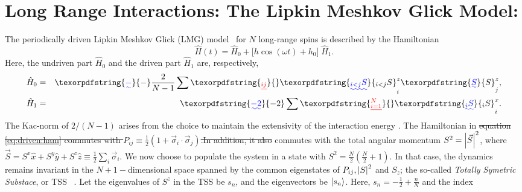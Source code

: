 \documentclass[%
reprint,
superscriptaddress,
amsmath,amssymb,
aps,
prb,
showkeys,
]{revtex4-2}
\providecommand{\DIFaddtex}[1]{{\protect\color{blue}\uwave{#1}}} %
\providecommand{\DIFdeltex}[1]{{\protect\color{red}\sout{#1}}}                      %
\providecommand{\DIFaddbegin}{} %
\providecommand{\DIFaddend}{} %
\providecommand{\DIFdelbegin}{} %
\providecommand{\DIFdelend}{} %
\providecommand{\DIFadd}[1]{\texorpdfstring{\DIFaddtex{#1}}{#1}} %
\providecommand{\DIFdel}[1]{\texorpdfstring{\DIFdeltex{#1}}{}} %
\newcommand{\DIFscaledelfig}{0.5}
\newlength{\DIFdelgraphicswidth} %
\newlength{\DIFdelgraphicsheight} %
\newcommand{\DIFaddincludegraphics}[2][]{{\color{blue}\fbox{\DIFOincludegraphics[#1]{#2}}}} %
\newcommand{\DIFdelincludegraphics}[2][]{%
\sbox{\DIFdelgraphicsbox}{\DIFOincludegraphics[#1]{#2}}%
\settoboxwidth{\DIFdelgraphicswidth}{\DIFdelgraphicsbox} %
\settoboxtotalheight{\DIFdelgraphicsheight}{\DIFdelgraphicsbox} %
\scalebox{\DIFscaledelfig}{%
\parbox[b]{\DIFdelgraphicswidth}{\usebox{\DIFdelgraphicsbox}\\[-\baselineskip] \rule{\DIFdelgraphicswidth}{0em}}\llap{\resizebox{\DIFdelgraphicswidth}{\DIFdelgraphicsheight}{%
\setlength{\unitlength}{\DIFdelgraphicswidth}%
\begin{picture}(1,1)%
\thicklines\linethickness{2pt} %
{\color[rgb]{1,0,0}\put(0,0){\framebox(1,1){}}}%
{\color[rgb]{1,0,0}\put(0,0){\line( 1,1){1}}}%
{\color[rgb]{1,0,0}\put(0,1){\line(1,-1){1}}}%
\end{picture}%
}\hspace*{3pt}}} %
} %
\DeclareRobustCommand{\DIFaddbegin}{\DIFOaddbegin \let\includegraphics\DIFaddincludegraphics} %
\DeclareRobustCommand{\DIFaddend}{\DIFOaddend \let\includegraphics\DIFOincludegraphics} %
\DeclareRobustCommand{\DIFdelbegin}{\DIFOdelbegin \let\includegraphics\DIFdelincludegraphics} %
\DeclareRobustCommand{\DIFdelend}{\DIFOaddend \let\includegraphics\DIFOincludegraphics} %
\begin{document}
\section{\label{sec:level3}Long Range Interactions: The Lipkin Meshkov Glick Model: }	
The periodically driven {Lipkin Meshkov Glick (LMG)} model~\cite{lmg1965_1,defenu2018} for $N$ long-range spins is described by the Hamiltonian
\begin{equation}
	\hat{H}(t) = \hat{H}_0 + \big[h \cos{(\omega t)} + h_0\big]\; \hat{H}_1.
	\label{eq:driven:ham}
\end{equation}
Here, the undriven part $\hat{H}_0$ and the driven part $\hat{H}_1$ are, respectively, 
	\begin{eqnarray}
		\hat{H}_0 &=& \DIFaddbegin \DIFadd{-}\DIFaddend \frac{2}{N-1} \sum\DIFdelbegin \DIFdel{_{ij}}%
\DIFdelend \DIFaddbegin \DIFadd{_{i<j}S}\DIFaddend ^z_i \DIFdelbegin %
\DIFdelend \DIFaddbegin \DIFadd{S}\DIFaddend ^z_j,\nonumber \\
		\hat{H}_1 &=& \DIFaddbegin \DIFadd{-2 }\DIFaddend \sum\DIFdelbegin \DIFdel{^N_{i=1}}%
\DIFdelend \DIFaddbegin \DIFadd{_i S}\DIFaddend ^x_i.
		\DIFaddbegin \label{eq:h0h1}
	\DIFaddend \end{eqnarray}
	\DIFdelbegin %
\DIFdelend The Kac-norm of $2/(N-1)$ arises from the choice to maintain the extensivity of the interaction energy\DIFdelbegin %
\DIFdelend . The Hamiltonian in \DIFdelbegin \DIFdel{equation \ref{eq:driven:ham} commutes with $P_{ij} \equiv \displaystyle\frac{1}{2}\left(1+ \vec{\sigma}_i\cdot\vec{\sigma}_j\right)$.In addition, it also }\DIFdelend \DIFaddbegin \DIFadd{eq.~\ref{eq:driven:ham} }\DIFaddend commutes
with the total angular momentum $S^2 = \abs{\vec{S}}^2$, where \DIFdelbegin \DIFdel{$\vec{S}=S^x\hat{x}+S^y\hat{y}+S^z\hat{z}\equiv\frac{1}{2} \sum_i \vec{\sigma}_i$}\DIFdelend \DIFaddbegin \DIFadd{$\vec{S_i}=\frac{1}{2} \sum_i \vec{\sigma}_i$}\DIFaddend . We now choose to populate the system in a state with $S^2=\displaystyle\frac{N}{2}\left(\frac{N}{2}+1\right)$. In that case, the dynamics remains invariant in the  $N+1-$dimensional space spanned by the common eigenstates of \DIFdelbegin \DIFdel{$P_{ij}, \abs{S}^2$ }\DIFdelend \DIFaddbegin \DIFadd{$P_{ij} \equiv \displaystyle\frac{1}{2}\left(1+ \vec{\sigma}_i\cdot\vec{\sigma}_j\right), \abs{S}^2$ }\DIFaddend and $S_z$; the so-called \textit{ Totally Symetric Substace}, or TSS ~\cite{mori_prethermalization_2019}. Let the eigenvalues of $S^z$ in the TSS be $s_n$, and the eigenvectors be $\ket{s_n}$. Here, $s_n=-\frac{1}{2}+\frac{n}{N}$ and the index
\end{document}
